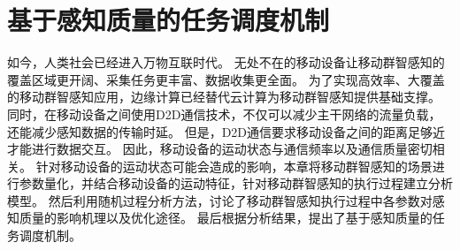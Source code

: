 

\chapter{基于感知质量的任务调度机制}

如今，人类社会已经进入万物互联时代。
无处不在的移动设备让移动群智感知的覆盖区域更开阔、采集任务更丰富、数据收集更全面。
为了实现高效率、大覆盖的移动群智感知应用，边缘计算已经替代云计算为移动群智感知提供基础支撑。
同时，在移动设备之间使用D2D通信技术，不仅可以减少主干网络的流量负载，还能减少感知数据的传输时延。
但是，D2D通信要求移动设备之间的距离足够近才能进行数据交互。
因此，移动设备的运动状态与通信频率以及通信质量密切相关。
针对移动设备的运动状态可能会造成的影响，本章将移动群智感知的场景进行参数量化，并结合移动设备的运动特征，针对移动群智感知的执行过程建立分析模型。
然后利用随机过程分析方法，讨论了移动群智感知执行过程中各参数对感知质量的影响机理以及优化途径。
最后根据分析结果，提出了基于感知质量的任务调度机制。



